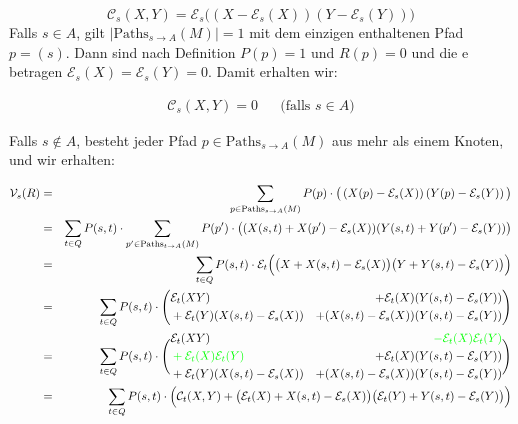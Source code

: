 \documentclass[a4paper]{article}
\theoremstyle{nonumberplain}
\begin{document}
\begin{equation}
\mathcal{C}_{s}(X,Y) = \mathcal{E}_{s}\big(\left(X - \mathcal{E}_{s} (X)\right)\left(Y - \mathcal{E}_{s} (Y)\right)\big)
\end{equation}
Falls $s \in A$, gilt $|\mathrm{Paths}_{s \rightarrow A}(M)| = 1$ mit dem einzigen enthaltenen Pfad $p = (s)$. Dann sind nach Definition $P(p) = 1$ und $R(p) = 0$ und die \expect{}e betragen $\mathcal{E}_{s}(X) = \mathcal{E}_{s}(Y) = 0$. Damit erhalten wir:

\begin{align}
\mathcal{C}_{s}(X,Y) = 0 && \text{(falls $s \in A$)}\label{cov_trivial}
\end{align}

Falls $s \notin A$, besteht jeder Pfad $p \in \mathrm{Paths}_{s \rightarrow A}(M)$ aus mehr als einem Knoten, und wir erhalten:

\begin{align}
\mathcal{V}_{s}(R) & = & \sum_{p \in \mathrm{Paths}_{s \rightarrow A}(M)}{P(p) \cdot \big(\left(X(p) - \mathcal{E}_{s} (X)\right)\left(Y(p) - \mathcal{E}_{s} (Y)\right)\big)} \\
& = & \sum_{t \in Q}{ P(s,t) \cdot \sum_{p' \in \mathrm{Paths}_{t \rightarrow A}(M)}{ P(p') \cdot \big((X(s,t) + X(p') - \mathcal{E}_{s}(X))(Y(s,t) + Y(p') - \mathcal{E}_{s}(Y))\big)} } \\
& = & \sum_{t \in Q}{ P(s,t) \cdot \mathcal{E}_{t}\Big(\big(X + X(s,t) - \mathcal{E}_{s}(X)\big)\big(Y + Y(s,t) - \mathcal{E}_{s}(Y)\big)\Big) }\\
& = & \sum_{t \in Q}P(s,t) \cdot \Bigg(\begin{aligned}
&\mathcal{E}_{t}(XY)
&+ \mathcal{E}_{t}(X)(Y(s,t) - \mathcal{E}_{s}(Y))\\
&+ \mathcal{E}_{t}(Y)(X(s,t) - \mathcal{E}_{s}(X))
&+ (X(s,t) - \mathcal{E}_{s}(X))(Y(s,t) - \mathcal{E}_{s}(Y))
\end{aligned} \Bigg)\\
& = & \sum_{t \in Q}P(s,t) \cdot \Bigg(\begin{aligned}
&\mathcal{E}_{t}(XY)
&\color{green}- \mathcal{E}_{t}(X)\mathcal{E}_{t}(Y)\\
&\color{green}+ \mathcal{E}_{t}(X)\mathcal{E}_{t}(Y)
&+ \mathcal{E}_{t}(X)(Y(s,t) - \mathcal{E}_{s}(Y))\\
&+ \mathcal{E}_{t}(Y)(X(s,t) - \mathcal{E}_{s}(X))
&+ (X(s,t) - \mathcal{E}_{s}(X))(Y(s,t) - \mathcal{E}_{s}(Y))
\end{aligned} \Bigg)\\
& = & \sum_{t \in Q}P(s,t) \cdot \Big( \mathcal{C}_{t}(X,Y) + \big(\mathcal{E}_{t}(X) + X(s,t) - \mathcal{E}_{s}(X)\big)\big(\mathcal{E}_{t}(Y) + Y(s,t) - \mathcal{E}_{s}(Y)\big)\Big)\label{cov_recursive}
\end{align}
\end{document}
